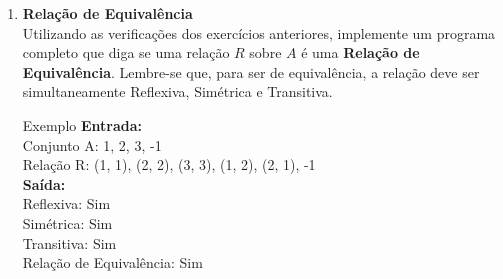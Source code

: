 \documentclass[12pt]{article}
\begin{document}
\begin{enumerate}
\begin{block}{Exemplo}
\textbf{Entrada:} \\
Conjunto A: 1, 2, 3, -1 \\
Relação R: (1, 2), (2, 3), (1, 3), -1 \\
\textbf{Saída:} \\
Transitiva: Sim \\
\textbf{Entrada 2:} \\
Relação R: (1, 2), (2, 3), -1 \\
\textbf{Saída 2:} \\
Transitiva: Não (falta (1, 3))
\end{block}

\vspace{0.3cm}
\item \textbf{Relação de Equivalência}\\
Utilizando as verificações dos exercícios anteriores, implemente um programa completo que diga se uma relação $R$ sobre $A$ é uma \textbf{Relação de Equivalência}. Lembre-se que, para ser de equivalência, a relação deve ser simultaneamente Reflexiva, Simétrica e Transitiva.

\begin{block}{Exemplo}
\textbf{Entrada:} \\
Conjunto A: 1, 2, 3, -1 \\
Relação R: (1, 1), (2, 2), (3, 3), (1, 2), (2, 1), -1 \\
\textbf{Saída:} \\
Reflexiva: Sim \\
Simétrica: Sim \\
Transitiva: Sim \\
Relação de Equivalência: Sim
\end{block}

\end{enumerate}
\end{document}
